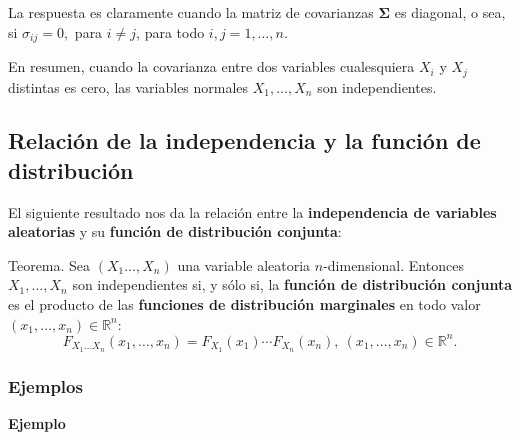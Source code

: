 \documentclass[]{book}
\begin{document}
La respuesta es claramente cuando la matriz de covarianzas \(\mathbf{\Sigma}\) es diagonal, o sea, si \(\sigma_{ij}=0,\) para \(i\neq j\), para todo \(i,j=1,\ldots,n\).

En resumen, cuando la covarianza entre dos variables cualesquiera \(X_i\) y \(X_j\) distintas es cero, las variables normales \(X_1,\ldots,X_n\) son independientes.

\hypertarget{relaciuxf3n-de-la-independencia-y-la-funciuxf3n-de-distribuciuxf3n-1}{%
\subsection{Relación de la independencia y la función de distribución}\label{relaciuxf3n-de-la-independencia-y-la-funciuxf3n-de-distribuciuxf3n-1}}

El siguiente resultado nos da la relación entre la \textbf{independencia de variables aleatorias} y su \textbf{función de distribución conjunta}:

Teorema.
Sea \((X_1\ldots,X_n)\) una variable aleatoria \(n\)-dimensional. Entonces
\(X_1,\ldots,X_n\) son independientes si, y sólo si, la \textbf{función de distribución conjunta} es el producto de las \textbf{funciones de distribución marginales} en todo valor \((x_1,\ldots,x_n)\in\mathbb{R}^n\):
\[
F_{X_1\ldots X_n}(x_1,\ldots,x_n)=F_{X_1}(x_1)\cdots F_{X_n}(x_n),\ (x_1,\ldots,x_n)\in\mathbb{R}^n.
\]

\hypertarget{ejemplos-14}{%
\subsubsection{Ejemplos}\label{ejemplos-14}}

\textbf{Ejemplo}
\end{document}
